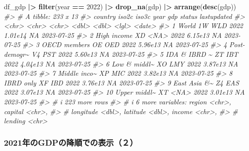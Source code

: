 \documentclass[
  xelatex, ja=standard]{bxjsbook}
\newenvironment{Shaded}{\begin{snugshade}}{\end{snugshade}}
\newcommand{\CommentTok}[1]{\textcolor[rgb]{0.56,0.35,0.01}{\textit{#1}}}
\newcommand{\DecValTok}[1]{\textcolor[rgb]{0.00,0.00,0.81}{#1}}
\newcommand{\FunctionTok}[1]{\textcolor[rgb]{0.13,0.29,0.53}{\textbf{#1}}}
\newcommand{\NormalTok}[1]{#1}
\newcommand{\SpecialCharTok}[1]{\textcolor[rgb]{0.81,0.36,0.00}{\textbf{#1}}}
\theoremstyle{definition}
\theoremstyle{definition}
\theoremstyle{definition}
\theoremstyle{definition}
\theoremstyle{remark}
\begin{document}
\begin{Shaded}
\begin{Highlighting}[]
\NormalTok{df\_gdp }\SpecialCharTok{|\textgreater{}} \FunctionTok{filter}\NormalTok{(year }\SpecialCharTok{==} \DecValTok{2022}\NormalTok{) }\SpecialCharTok{|\textgreater{}} \FunctionTok{drop\_na}\NormalTok{(gdp) }\SpecialCharTok{|\textgreater{}} \FunctionTok{arrange}\NormalTok{(}\FunctionTok{desc}\NormalTok{(gdp))}
\CommentTok{\#\textgreater{} \# A tibble: 233 x 13}
\CommentTok{\#\textgreater{}    country      iso2c iso3c  year     gdp status lastupdated}
\CommentTok{\#\textgreater{}    \textless{}chr\textgreater{}        \textless{}chr\textgreater{} \textless{}chr\textgreater{} \textless{}dbl\textgreater{}   \textless{}dbl\textgreater{} \textless{}lgl\textgreater{}  \textless{}date\textgreater{}     }
\CommentTok{\#\textgreater{}  1 World        1W    WLD    2022 1.01e14 NA     2023{-}07{-}25 }
\CommentTok{\#\textgreater{}  2 High income  XD    \textless{}NA\textgreater{}   2022 6.15e13 NA     2023{-}07{-}25 }
\CommentTok{\#\textgreater{}  3 OECD members OE    OED    2022 5.96e13 NA     2023{-}07{-}25 }
\CommentTok{\#\textgreater{}  4 Post{-}demogr\textasciitilde{} V4    PST    2022 5.60e13 NA     2023{-}07{-}25 }
\CommentTok{\#\textgreater{}  5 IDA \& IBRD \textasciitilde{} ZT    IBT    2022 4.04e13 NA     2023{-}07{-}25 }
\CommentTok{\#\textgreater{}  6 Low \& middl\textasciitilde{} XO    LMY    2022 3.87e13 NA     2023{-}07{-}25 }
\CommentTok{\#\textgreater{}  7 Middle inco\textasciitilde{} XP    MIC    2022 3.82e13 NA     2023{-}07{-}25 }
\CommentTok{\#\textgreater{}  8 IBRD only    XF    IBD    2022 3.76e13 NA     2023{-}07{-}25 }
\CommentTok{\#\textgreater{}  9 East Asia \&\textasciitilde{} Z4    EAS    2022 3.07e13 NA     2023{-}07{-}25 }
\CommentTok{\#\textgreater{} 10 Upper middl\textasciitilde{} XT    \textless{}NA\textgreater{}   2022 3.01e13 NA     2023{-}07{-}25 }
\CommentTok{\#\textgreater{} \# i 223 more rows}
\CommentTok{\#\textgreater{} \# i 6 more variables: region \textless{}chr\textgreater{}, capital \textless{}chr\textgreater{},}
\CommentTok{\#\textgreater{} \#   longitude \textless{}dbl\textgreater{}, latitude \textless{}dbl\textgreater{}, income \textless{}chr\textgreater{},}
\CommentTok{\#\textgreater{} \#   lending \textless{}chr\textgreater{}}
\end{Highlighting}
\end{Shaded}

\hypertarget{ux5e74ux306egdpux306eux964dux9806ux3067ux306eux8868ux793auxff12}{%
\subsubsection{2021年のGDPの降順での表示（２）}\label{ux5e74ux306egdpux306eux964dux9806ux3067ux306eux8868ux793auxff12}}
\end{document}
